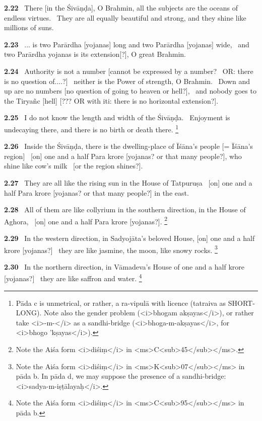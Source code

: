 \documentclass{article}
\begin{document}
\textbf{2.22}%
\ There [in the Śivāṇḍa], O Brahmin, all the subjects are the oceans of endless virtues.%
\              They are all equally beautiful and strong, and they shine like millions of suns.%


\textbf{2.23}%
\ ... is two Parārdha [yojanas] long and two Parārdha [yojanas] wide,%
\              and two Parārdha yojanas is its extension[?], O great Brahmin.%


\textbf{2.24}%
\ Authority is not a number [cannot be expressed by a number?%
\                OR: there is no question of....?]%
\         neither is the Power of strength, O Brahmin.%
\         Down and up are no numbers [no question of going to heaven or hell?],%
\                 and nobody goes to the Tiryañc [hell] [??? OR with iti: there is no horizontal extension?].%


\textbf{2.25}%
\ I do not know the length and width of the Śivāṇḍa.%
\              Enjoyment is undecaying there, and there is no birth or death there.%
\footnote{Pāda c is unmetrical, or rather, a ra-vipulā with licence                 (tatraiva as SHORT-LONG). Note also the gender problem                 (<i>bhogam akṣayas</i>), or rather take <i>-m-</i> as a sandhi-bridge                 (<i>bhoga-m-akṣayas</i>, for <i>bhogo 'kṣayas</i>). }%


\textbf{2.26}%
\ Inside the Śivāṇḍa, there is the dwelling-place of Īśāna's people [= Īśāna's region]%
\              [on] one and a half Para krore [yojanas? or that many people?], who shine like cow's milk%
\                 [or the region shines?].%


\textbf{2.27}%
\ They are all like the rising sun in the House of Tatpuruṣa%
\              [on] one and a half Para krore [yojanas? or that many people?] in the east.%


\textbf{2.28}%
\ All of them are like collyrium in the southern direction, in the House of Aghora,%
\              [on] one and a half Para krore [yojanas?].%
\footnote{Note the Aiśa form <i>diśiṃ</i> in <ms>C<sub>45</sub></ms>. }%


\textbf{2.29}%
\ In the western direction, in Sadyojāta's beloved House, [on] one and a half krore [yojanas?]%
\              they are like jasmine, the moon, like snowy rocks.%
\footnote{Note the Aiśa form <i>diśiṃ</i> in <ms>K<sub>07</sub></ms> in pāda b.                In pāda d, we may suppose the presence of a sandhi-bridge:                <i>sadya-m-iṣṭālayaḥ</i>. }%


\textbf{2.30}%
\ In the northern direction, in Vāmadeva's House of one and a half krore [yojanas?]%
\              they are like saffron and water.%
\footnote{Note the Aiśa form <i>diśiṃ</i> in <ms>C<sub>95</sub></ms> in pāda b. }%
\end{document}
